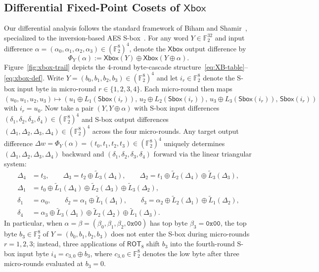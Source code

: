 \documentclass[11pt,a4paper]{article}
\theoremstyle{definition}
\theoremstyle{remark}
\newcommand{\Ftwo}{\mathbb{F}_2}
\newcommand{\Xbox}{\mathsf{Xbox}}
\newcommand{\Sbox}{\mathsf{Sbox}}
\newcommand{\ROT}{\mathsf{ROT}_8}
\begin{document}
\subsection{Differential Fixed-Point Cosets of \texorpdfstring{$\Xbox$}{Xbox}}
\label{subsec:xbox-coset}

Our differential analysis follows the standard framework of Biham and Shamir~\cite{BihamShamir}, specialized to the inversion-based AES S-box~\cite{Nyberg}. For any word $Y \in \Ftwo^{32}$ and input difference $\alpha = (\alpha_0, \alpha_1, \alpha_2, \alpha_3) \in (\Ftwo^8)^4$, denote the $\Xbox$ output difference by
\[
\Phi_Y(\alpha) := \Xbox(Y) \oplus \Xbox(Y \oplus \alpha).
\]
Figure~\ref{fig:xbox-trail} depicts the $4$-round byte-cascade structure~\eqref{eq:XB-table}--\eqref{eq:xbox-def}. Write $Y = (b_0, b_1, b_2, b_3) \in (\Ftwo^8)^4$ and let $i_r \in \Ftwo^8$ denote the S-box input byte in micro-round $r \in \{1, 2, 3, 4\}$. Each micro-round then maps $(u_0, u_1, u_2, u_3) \mapsto (u_1 \oplus L_1(\Sbox(i_r)), \, u_2 \oplus L_2(\Sbox(i_r)), \, u_3 \oplus L_3(\Sbox(i_r)), \, \Sbox(i_r))$ with $i_r = u_0$. Now take a pair $(Y, Y \oplus \alpha)$ with S-box input differences $(\delta_1, \delta_2, \delta_3, \delta_4) \in (\Ftwo^8)^4$ and S-box output differences $(\Delta_1, \Delta_2, \Delta_3, \Delta_4) \in (\Ftwo^8)^4$ across the four micro-rounds. Any target output difference $\Delta w = \Phi_Y(\alpha) = (t_0, t_1, t_2, t_3) \in (\Ftwo^8)^4$ uniquely determines $(\Delta_1, \Delta_2, \Delta_3, \Delta_4)$ backward and $(\delta_1, \delta_2, \delta_3, \delta_4)$ forward via the linear triangular system:
\begin{align}
\Delta_4 &= t_3, \qquad \Delta_3 = t_2 \oplus \tilde{L}_3(\Delta_4), \qquad \Delta_2 = t_1 \oplus \tilde{L}_2(\Delta_4) \oplus \tilde{L}_3(\Delta_3), \nonumber \\
\Delta_1 &= t_0 \oplus \tilde{L}_1(\Delta_4) \oplus \tilde{L}_2(\Delta_3) \oplus \tilde{L}_3(\Delta_2), \label{eq:ds-back} \\
\delta_1 &= \alpha_0, \qquad \delta_2 = \alpha_1 \oplus \tilde{L}_1(\Delta_1), \qquad \delta_3 = \alpha_2 \oplus \tilde{L}_2(\Delta_1) \oplus \tilde{L}_1(\Delta_2), \nonumber \\
\delta_4 &= \alpha_3 \oplus \tilde{L}_3(\Delta_1) \oplus \tilde{L}_2(\Delta_2) \oplus \tilde{L}_1(\Delta_3). \label{eq:ek-fwd}
\end{align}
In particular, when $\alpha = \beta = (\beta_0, \beta_1, \beta_2, \mathtt{0x00})$ has top byte $\beta_3 = \mathtt{0x00}$, the top byte $b_3 \in \Ftwo^8$ of $Y = (b_0, b_1, b_2, b_3)$ does not enter the S-box during micro-rounds $r = 1, 2, 3$; instead, three applications of $\ROT$ shift $b_3$ into the fourth-round S-box input byte $i_4 = c_{3,0} \oplus b_3$, where $c_{3,0} \in \Ftwo^8$ denotes the low byte after three micro-rounds evaluated at $b_3 = 0$.
\end{document}
